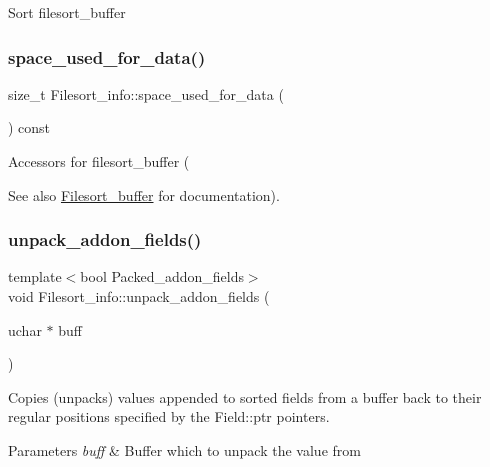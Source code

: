 Sort filesort\+\_\+buffer \mbox{\label{classFilesort__info_a67f9f112962f35197841045fd24d9f85}} 
\subsubsection{\texorpdfstring{space\+\_\+used\+\_\+for\+\_\+data()}{space\_used\_for\_data()}}
{\footnotesize\ttfamily size\+\_\+t Filesort\+\_\+info\+::space\+\_\+used\+\_\+for\+\_\+data (\begin{DoxyParamCaption}{ }\end{DoxyParamCaption}) const\hspace{0.3cm}{\ttfamily [inline]}}

Accessors for filesort\+\_\+buffer (\begin{DoxySeeAlso}{See also}
\mbox{\hyperlink{classFilesort__buffer}{Filesort\+\_\+buffer}} for documentation). 
\end{DoxySeeAlso}
\mbox{\label{classFilesort__info_a972ae7583ff223e13df5b6d6cf4d0de8}} 
\subsubsection{\texorpdfstring{unpack\+\_\+addon\+\_\+fields()}{unpack\_addon\_fields()}}
{\footnotesize\ttfamily template$<$bool Packed\+\_\+addon\+\_\+fields$>$ \\
void Filesort\+\_\+info\+::unpack\+\_\+addon\+\_\+fields (\begin{DoxyParamCaption}\item[{uchar $\ast$}]{buff }\end{DoxyParamCaption})\hspace{0.3cm}{\ttfamily [inline]}}

Copies (unpacks) values appended to sorted fields from a buffer back to their regular positions specified by the Field\+::ptr pointers. 
\begin{DoxyParams}{Parameters}
{\em buff} & Buffer which to unpack the value from \\
\hline
\end{DoxyParams}


